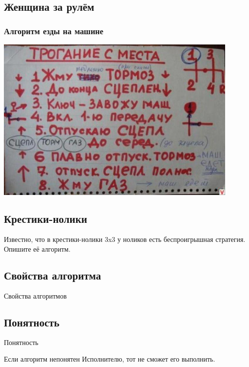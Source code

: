\documentclass[compress,red]{beamer}
\begin{document}
\subsection{Женщина за рулём}
\begin{frame}[fragile]
  \frametitle{Алгоритм езды на машине}
  \centerline{\includegraphics[width=0.9\textwidth]{images/algo_woman_car.jpg}}
\end{frame}

\subsection{Крестики-нолики}
\begin{frame}
  \begin{center}
    \Large{Известно, что в крестики-нолики 3x3 у ноликов есть беспроигрышная стратегия. Опишите её алгоритм.}
  \end{center}
\end{frame}


\subsection{Свойства алгоритма}
\begin{frame}
  \begin{center}
    \Huge{Свойства алгоритмов}
  \end{center}
\end{frame}

\subsection{Понятность}
\begin{frame}
  \begin{center}
    \Huge{Понятность}
  \end{center}
  \begin{center}
    \Large{Если алгоритм непонятен Исполнителю, тот не сможет его выполнить.}
  \end{center}
\end{frame}
\end{document}
